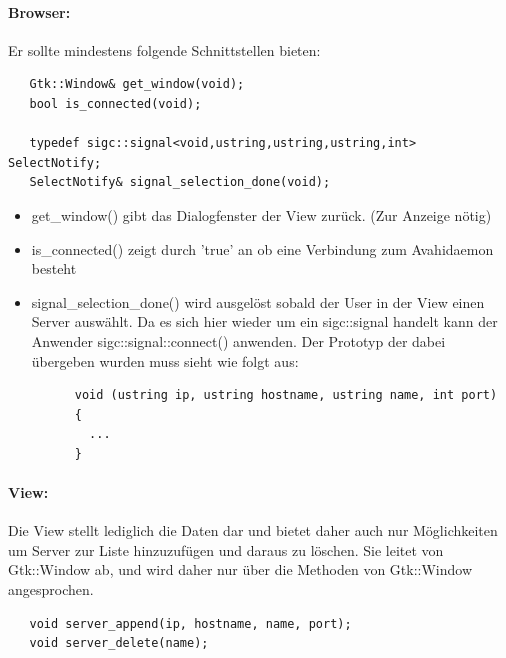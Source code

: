 \paragraph{Browser:}
Er sollte mindestens folgende Schnittstellen bieten:
\begin{verbatim}
   Gtk::Window& get_window(void);
   bool is_connected(void);

   typedef sigc::signal<void,ustring,ustring,ustring,int> SelectNotify;
   SelectNotify& signal_selection_done(void);
\end{verbatim}
\begin{itemize}
\item get\_window() gibt das Dialogfenster der View zurück. (Zur Anzeige nötig)
\item is\_connected() zeigt durch 'true' an ob eine Verbindung zum Avahidaemon besteht
\item signal\_selection\_done() wird ausgelöst sobald der User in der View einen Server auswählt. 
      Da es sich hier wieder um ein sigc::signal handelt kann der Anwender sigc::signal::connect() anwenden.
      Der Prototyp der dabei übergeben wurden muss sieht wie folgt aus:
      \begin{verbatim}
      void (ustring ip, ustring hostname, ustring name, int port)
      {
        ...
      }
      \end{verbatim}
\end{itemize}

\paragraph{View:}
Die View stellt lediglich die Daten dar und bietet daher auch nur Möglichkeiten um Server zur Liste hinzuzufügen
und daraus zu löschen. Sie leitet von Gtk::Window ab, und wird daher nur über die Methoden von Gtk::Window angesprochen.
\begin{verbatim}
   void server_append(ip, hostname, name, port);
   void server_delete(name);
\end{verbatim}
